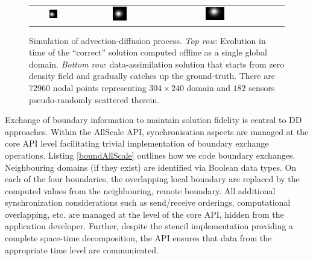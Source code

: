 \documentclass[conference,compsoc]{IEEEtran}
\begin{document}
\begin{figure}[t!]
\begin{tabular}{ccccc}
\includegraphics[width=0.19\textwidth]{images/field-t=1232} & 
\includegraphics[width=0.19\textwidth]{images/field-t=3006} &
\includegraphics[width=0.19\textwidth]{images/field-t=4089} 
\end{tabular}
\caption{Simulation of advection-diffusion process. \textit{Top row}: Evolution in time of the ``correct'' solution computed offline as a single global domain. \textit{Bottom row}: data-assimilation solution that starts from zero density field and gradually catches up the ground-truth. There are $72960$ nodal points representing $304{\times}240$ domain and $182$ sensors pseudo-randomly scattered therein.}
\label{fig:density}
\end{figure}




Exchange of boundary information to maintain solution fidelity is central to DD approaches. Within the AllScale API, synchronisation aspects are managed at the core API level facilitating trivial implementation of boundary exchange operations. Listing \ref{boundAllScale} outlines how we code boundary exchanges. Neighbouring domains (if they exist) are identified via Boolean data types. On each of the four boundaries, the overlapping local boundary are replaced by the computed values from the neighbouring, remote boundary. All additional synchronization considerations such as send/receive orderings, computational overlapping, etc. are managed at the level of the core API, hidden from the application developer. Further, despite the stencil implementation providing a complete space-time decomposition, the API ensures that data from the appropriate time level are communicated. 
\end{document}
